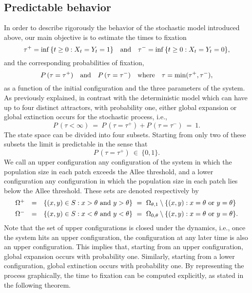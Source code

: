\subsection{ Predictable behavior}

\indent In order to describe rigorously the behavior of the stochastic model introduced above, our main objective is to
 estimate the times to fixation
 $$ \tau^+ = \inf \,\{t \geq 0 : X_t = Y_t = 1 \} \quad \hbox{and} \quad
    \tau^- = \inf \,\{t \geq 0 : X_t = Y_t = 0 \}, $$
 and the corresponding probabilities of fixation,
 $$ P \,(\tau = \tau^+) \quad \hbox{and} \quad
    P \,(\tau = \tau^-) \quad \hbox{where} \quad \tau = \min (\tau^+, \tau^-), $$
 as a function of the initial configuration and the three parameters of the system.
 As previously explained, in contrast with the deterministic model which can have up to four distinct attractors, with
 probability one, either global expansion or global extinction occurs for the stochastic process, i.e.,
 $$ P \,(\tau < \infty) \ = \ P \,(\tau = \tau^+) + P \,(\tau = \tau^-) \ = \ 1. $$
 The state space can be divided into four subsets.
 Starting from only two of these subsets the limit is predictable in the sense that
 $$ P \,(\tau = \tau^+) \ \in \ \{0, 1 \}. $$
 We call an upper configuration any configuration of the system in which the population size in each patch exceeds the Allee
 threshold, and a lower configuration any configuration in which the population size in each patch lies below the Allee threshold.
 These sets are denoted respectively by
 $$ \begin{array}{rcl}
    \Omega^+ & = & \{(x, y) \in S : x > \theta \ \hbox{and} \ y > \theta \} \ = \
    \Omega_{\theta, 1} \setminus \{(x, y) : x = \theta \ \hbox{or} \ y = \theta \} \vspace{4pt} \\
    \Omega^- & = & \{(x, y) \in S : x < \theta \ \hbox{and} \ y < \theta \} \ = \
    \Omega_{0, \theta} \setminus \{(x, y) : x = \theta \ \hbox{or} \ y = \theta \}. \end{array} $$
 Note that the set of upper configurations is closed under the dynamics, i.e., once the system hits an upper configuration,
 the configuration at any later time is also an upper configuration.
 This implies that, starting from an upper configuration, global expansion occurs with probability one.
 Similarly, starting from a lower configuration, global extinction occurs with probability one.
 By representing the process graphically, the time to fixation can be computed explicitly, as stated in the following theorem.
